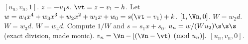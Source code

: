 \begin{algorithm}[htbp]
\begin{algorithmic} [1]
        \State \Return $[u_n,v_n,1]$.
    \EndIf
\EndIf
\State $z = -u_1s$.
\State $\vt = z - v_1 - h$.
\State Let $w = w_4x^4 + w_3x^3 + w_2x^2 + w_1x + w_0 = s(\vt - v_1) + k$.
         \Return $[1,\Vn,0]$.
        \Else \hspace{3pt} $W = w_2d$.
        \EndIf
    \Else \hspace{3pt} $W = w_3d$.
    \EndIf
\Else \hspace{3pt} $W = w_4d$.
\EndIf
\State Compute $1/W$ and $s = s_1x + s_0$.
\State $u_n = w/(Wu_2) \s\s\s$ (exact division, made monic).
\State $v_n = \Vn - [(\Vn - \vt) \pmod{u_n}].$ 
\State \Return $[u_n,v_n,0]$.
\vspace{-2pt}
\end{algorithmic}
\end{algorithm}




